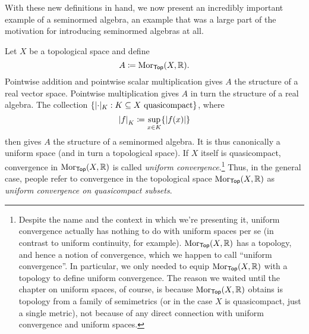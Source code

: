 With these new definitions in hand, we now present an incredibly important example of a seminormed algebra, an example that was a large part of the motivation for introducing seminormed algebras at all.
\begin{exm}\label{exm4.3.60}
Let $X$ be a topological space and define
\begin{equation}
A\coloneqq \operatorname{Mor} _{\mathsf{Top}}(X,\mathbb{R} ).
\end{equation}
Pointwise addition and pointwise scalar multiplication gives $A$ the structure of a real vector space.  Pointwise multiplication gives $A$ in turn the structure of a real algebra.  The collection $\{ \norm _K:K\subseteq X\text{ quasicompact}\}$, where
\begin{equation}
\norm[f]_K\coloneqq \sup _{x\in K}\{ \abs{f(x)}\} 
\end{equation}
then gives $A$ the structure of a seminormed algebra.  It is thus canonically a uniform space (and in turn a topological space).  If $X$ itself is quasicompact, convergence in $\operatorname{Mor} _{\mathsf{Top}}(X,\mathbb{R} )$ is called \emph{uniform convergence}.\footnote{Despite the name and the context in which we're presenting it, uniform convergence actually has nothing to do with uniform spaces per se (in contrast to uniform continuity, for example).  $\operatorname{Mor} _{\mathsf{Top}}(X,\mathbb{R} )$ has a topology, and hence a notion of convergence, which we happen to call ``uniform convergence''.  In particular, we only needed to equip $\operatorname{Mor} _{\mathsf{Top}}(X,\mathbb{R} )$ with a topology to define uniform convergence.  The reason we waited until the chapter on uniform spaces, of course, is because $\operatorname{Mor} _{\mathsf{Top}}(X,\mathbb{R} )$ obtains is topology from a family of semimetrics (or in the case $X$ is quasicompact, just a single metric), not because of any direct connection with uniform convergence and uniform spaces.}  Thus, in the general case, people refer to convergence in the topological space $\operatorname{Mor} _{\mathsf{Top}}(X,\mathbb{R} )$ as \emph{uniform convergence on quasicompact subsets}.


\end{exm}
